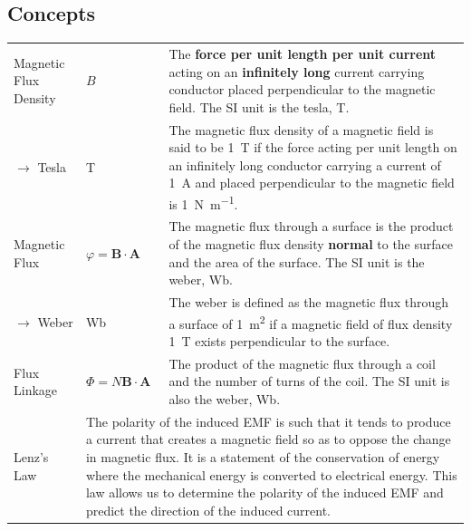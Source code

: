 \documentclass[a4paper,11pt]{article}
\begin{document}
	\subsection{Concepts}
	\begin{center}
		\renewcommand{\arraystretch}{1.2}
		\begin{tabular}{@{} l l p{8.6cm} @{}}
			\toprule
			Magnetic Flux Density & $B$ & The \textbf{force per unit length per unit current} acting on an \textbf{infinitely long} current carrying conductor placed perpendicular to the magnetic field. The SI unit is the tesla, \si{\tesla}. \\
			$\rightarrow$ Tesla & \si{\tesla} & The magnetic flux density of a magnetic field is said to be \SI{1}{\tesla} if the force acting per unit length on an infinitely long conductor carrying a current of \SI{1}{\ampere} and placed perpendicular to the magnetic field is \SI{1}{\newton\per\meter}. \\
			Magnetic Flux & $\varphi=\textbf{B}\cdot\textbf{A}$ & The magnetic flux through a surface is the product of the magnetic flux density \textbf{normal} to the surface and the area of the surface. The SI unit is the weber, \si{\weber}. \\
			$\rightarrow$ Weber & \si{\weber} & The weber is defined as the magnetic flux through a surface of \SI{1}{\meter\squared} if a magnetic field of flux density \SI{1}{\tesla} exists perpendicular to the surface.\\
			Flux Linkage & $\Phi=N\textbf{B}\cdot\textbf{A}$ & The product of the magnetic flux through a coil and the number of turns of the coil. The SI unit is also the weber, \si{\weber}. \\
			\midrule
			Lenz's Law & \multicolumn{2}{p{11.1cm}}{The polarity of the induced EMF is such that it tends to produce a current that creates a magnetic field so as to oppose the change in magnetic flux. It is a statement of the conservation of energy where the mechanical energy is converted to electrical energy. This law allows us to determine the polarity of the induced EMF and predict the direction of the induced current.} \\
			\bottomrule
		\end{tabular}
	\end{center}
\end{document}
